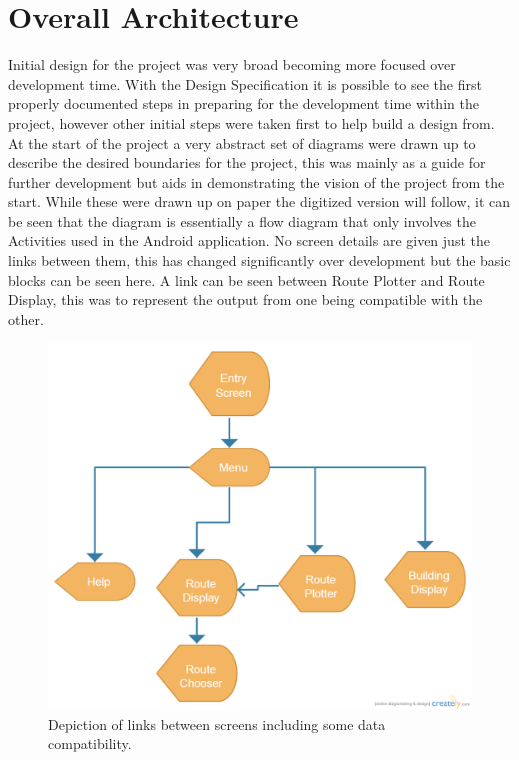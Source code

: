 \section{Overall Architecture}
Initial design for the project was very broad becoming more focused over development time. With the Design Specification it is possible to see the first properly documented steps in preparing for the development time within the project, however other initial steps were taken first to help build a design from. At the start of the project a very abstract set of diagrams were drawn up to describe the desired boundaries for the project, this was mainly as a guide for further development but aids in demonstrating the vision of the project from the start. While these were drawn up on paper the digitized version will follow, it can be seen that the diagram is essentially a flow diagram that only involves the Activities used in the Android application. No screen details are given just the links between them, this has changed significantly over development but the basic blocks can be seen here. A link can be seen between Route Plotter and Route Display, this was to represent the output from one being compatible with the other. \\
\begin{figure}[h]
\includegraphics[scale=0.30]{Chapter2/screen.png}
\caption[Screen Flow]{Depiction of links between screens including some data compatibility.}
\end{figure}

